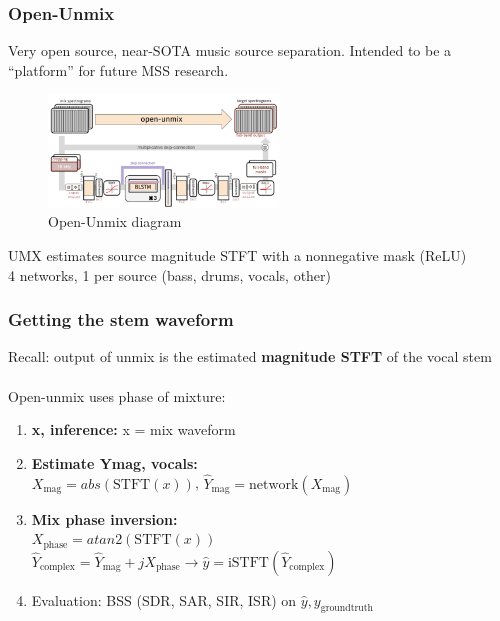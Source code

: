 \documentclass[usenames,dvipsnames]{beamer}
\begin{document}
\begin{frame}
	\frametitle{Open-Unmix}
	Very open source, near-SOTA music source separation. Intended to be a ``platform'' for future MSS research.
	\begin{figure}[ht]
		\includegraphics[height=3cm]{./umx1.png}
		\caption{Open-Unmix diagram}
	\end{figure}
	UMX estimates source magnitude STFT with a nonnegative mask (ReLU)\\
	4 networks, 1 per source (bass, drums, vocals, other)
\end{frame}

\begin{frame}
	\frametitle{Getting the stem waveform}
	Recall: output of unmix is the estimated \textbf{magnitude STFT} of the vocal stem\\\ \\

	Open-unmix uses phase of mixture:
	\begin{enumerate}
		\item
			\textbf{x, inference:} x = mix waveform
		\item
			\textbf{Estimate Ymag, vocals:}\\
			\qquad $X_{\text{mag}} = abs(\text{STFT}(x))$, $\hat{Y}_{\text{mag}} = \text{network}(X_{\text{mag}})$
		\item
			\textbf{Mix phase inversion:}\\
			\qquad $X_{\text{phase}} = atan2(\text{STFT}(x))$\\
			\qquad $\hat{Y}_{\text{complex}} = \hat{Y}_{\text{mag}} + j X_{\text{phase}} \rightarrow \hat{y} = \text{iSTFT}(\hat{Y}_{\text{complex}})$
		\item
			Evaluation: BSS (SDR, SAR, SIR, ISR) on $\hat{y}, y_{\text{groundtruth}}$
	\end{enumerate}
\end{frame}
\end{document}
